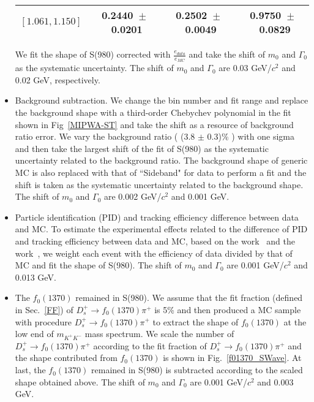 \documentclass[aps,prd,twocolumn,showpacs,amsmath,amssymb]{revtex4-1}
\begin{document}
\begin{itemize}
\begin{table*}[htbp]
\begin{center}
\begin{tabular}{cccc}
                        $[1.061, 1.150]$ &                0.2440\ $\pm$\ 0.0201 & 0.2502\ $\pm$\ 0.0049 & 0.9750\ $\pm$\ 0.0829 \\
                        \hline\hline
                    \end{tabular}
                \end{center}
            \end{table*}
            We fit the shape of S(980) corrected with $\frac{e_{data}}{e_{MC}}$ and take the shift of $m_{0}$ and $\Gamma_{0}$ as the systematic uncertainty. The shift of $m_{0}$ and $\Gamma_{0}$ are 0.03 GeV/$c^{2}$ and 0.02 GeV, respectively.

        \item \uppercase\expandafter{} Background subtraction. 
            We change the bin number and fit range and replace the background shape with a third-order Chebychev polynomial in the fit shown in Fig~\ref{MIPWA-ST} and take the shift as a resource of background ratio error.
            We vary the background ratio ( (3.8 $\pm$ 0.3)\% ) with one sigma and then take the largest shift of the fit of S(980) as the systematic uncertainty related to the background ratio. 
            The background shape of generic MC is also replaced with that of ``Sideband" for data to perform a fit and the shift is taken as the systematic uncertainty related to the background shape.
            The shift of $m_{0}$ and $\Gamma_{0}$ are 0.002 GeV/$c^{2}$ and 0.001 GeV.

        \item \uppercase\expandafter{} Particle identification (PID) and tracking efficiency difference between data and MC. 
            To estimate the experimental effects related to the difference of PID and tracking efficiency between data and MC, based on the work~\cite{PID} and the work~\cite{Tracking}, we weight each event with the efficiency of data divided by that of MC and fit the shape of S(980).
            The shift of $m_{0}$ and $\Gamma_{0}$ are 0.001 GeV/$c^{2}$ and 0.013 GeV.

        \item \uppercase\expandafter{} The $f_{0}(1370)$ remained in S(980). 
            We assume that the fit fraction (defined in Sec.~\ref{FF}) of $D_{s}^{+} \rightarrow f_{0}(1370)\pi^{+}$ is 5\% and then produced a MC sample with procedure $D_{s}^{+} \rightarrow f_{0}(1370)\pi^{+}$ to extract the shape of $f_{0}(1370)$ at the low end of $m_{K^{+}K^{-}}$ mass spectrum.
            We scale the number of $D_{s}^{+} \rightarrow f_{0}(1370)\pi^{+}$ according to the fit fraction of $D_{s}^{+} \rightarrow f_{0}(1370)\pi^{+}$ and the shape contributed from $f_{0}(1370)$ is shown in Fig.~\ref{f01370_SWave}.
            At last, the $f_{0}(1370)$ remained in S(980) is subtracted according to the scaled shape obtained above.
            The shift of $m_{0}$ and $\Gamma_{0}$ are 0.001 GeV/$c^{2}$ and 0.003 GeV.


\end{itemize}
\end{document}

